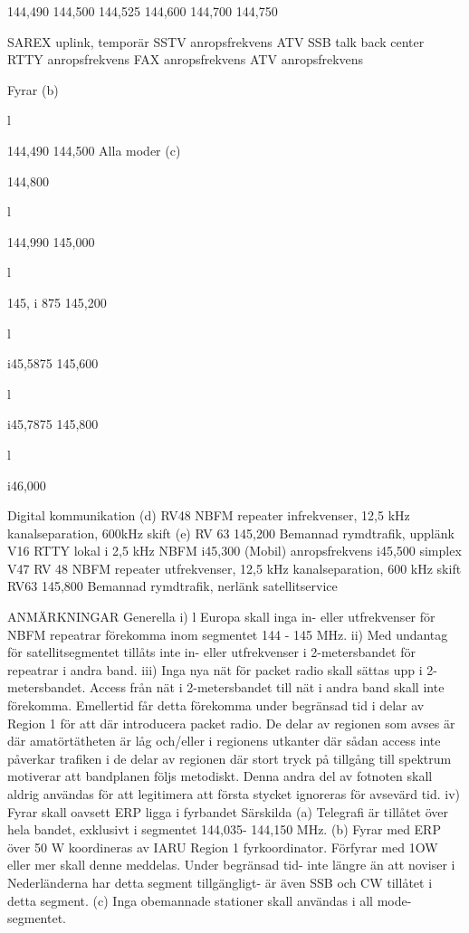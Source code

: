 \documentclass[a4paper,twoside,twocolumn,openright]{book}
\begin{document}
{{{{{{{{{{{144,490
144,500
144,525
144,600
144,700
144,750

SAREX uplink, temporär
SSTV anropsfrekvens
ATV SSB talk back center
RTTY anropsfrekvens
FAX anropsfrekvens
ATV anropsfrekvens

Fyrar (b)

l

144,490
144,500
Alla moder (c)

144,800

l

144,990
145,000

l

145, i 875
145,200

l

i45,5875
145,600

l

i45,7875
145,800

l

i46,000

Digital kommunikation (d)
RV48
NBFM repeater infrekvenser, 12,5 kHz kanalseparation, 600kHz skift (e)
RV 63
145,200
Bemannad rymdtrafik, upplänk
V16
RTTY lokal
i 2,5 kHz NBFM
i45,300
(Mobil) anropsfrekvens
i45,500
simplex
V47
RV 48
NBFM repeater utfrekvenser, 12,5 kHz kanalseparation, 600 kHz skift
RV63
145,800
Bemannad rymdtrafik, nerlänk
satellitservice

ANMÄRKNINGAR
Generella
i) l Europa skall inga in- eller utfrekvenser för NBFM repeatrar förekomma inom segmentet 144 - 145 MHz.
ii) Med undantag för satellitsegmentet tillåts inte in- eller utfrekvenser i 2-metersbandet för repeatrar i andra band.
iii) Inga nya nät för packet radio skall sättas upp i 2-metersbandet.
Access från nät i 2-metersbandet till nät i andra band skall inte förekomma. Emellertid får detta förekomma
under begränsad tid i delar av Region 1 för att där introducera packet radio. De delar av regionen som avses är
där amatörtätheten är låg och/eller i regionens utkanter där sådan access inte påverkar trafiken i de delar av
regionen där stort tryck på tillgång till spektrum motiverar att bandplanen följs metodiskt. Denna andra del av
fotnoten skall aldrig användas för att legitimera att första stycket ignoreras för avsevärd tid.
iv) Fyrar skall oavsett ERP ligga i fyrbandet
Särskilda
(a) Telegrafi är tillåtet över hela bandet, exklusivt i segmentet 144,035- 144,150 MHz.
(b) Fyrar med ERP över 50 W koordineras av IARU Region 1 fyrkoordinator. Förfyrar med 1OW eller mer skall denne
meddelas. Under begränsad tid- inte längre än att noviser i Nederländerna har detta segment tillgängligt- är
även SSB och CW tillåtet i detta segment.
(c) Inga obemannade stationer skall användas i all mode-segmentet.

}}}}}}}}}}}
\end{document}
